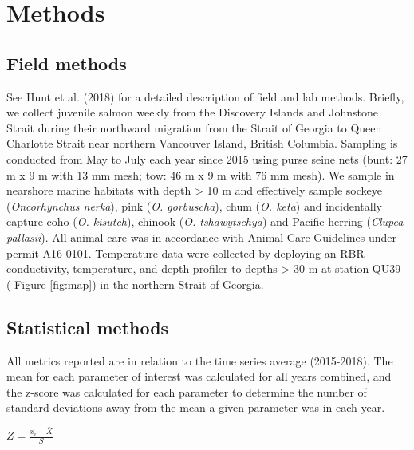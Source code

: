\documentclass[fleqn,10pt]{wlpeerj} %
\begin{document}
\section*{Methods}\label{methods}

\subsection*{Field methods}\label{field-methods}

See Hunt et al. (2018) for a detailed description of field and lab
methods. Briefly, we collect juvenile salmon weekly from the Discovery
Islands and Johnstone Strait during their northward migration from the
Strait of Georgia to Queen Charlotte Strait near northern Vancouver
Island, British Columbia. Sampling is conducted from May to July each
year since 2015 using purse seine nets (bunt: 27 m x 9 m with 13 mm
mesh; tow: 46 m x 9 m with 76 mm mesh). We sample in nearshore marine
habitats with depth \textgreater{} 10 m and effectively sample sockeye
(\emph{Oncorhynchus nerka}), pink (\emph{O. gorbuscha}), chum (\emph{O.
keta}) and incidentally capture coho (\emph{O. kisutch}), chinook
(\emph{O. tshawytschya}) and Pacific herring (\emph{Clupea pallasii}).
All animal care was in accordance with Animal Care Guidelines under
permit A16-0101. Temperature data were collected by deploying an RBR
conductivity, temperature, and depth profiler to depths \textgreater{}
30 m at station QU39 ( Figure \ref{fig:map}) in the northern Strait of
Georgia.

\subsection*{Statistical methods}\label{statistical-methods}

All metrics reported are in relation to the time series average
(2015-2018). The mean for each parameter of interest was calculated for
all years combined, and the z-score was calculated for each parameter to
determine the number of standard deviations away from the mean a given
parameter was in each year.

\(Z = {\frac{x_i - \bar X}{{S}}}\)
\end{document}
